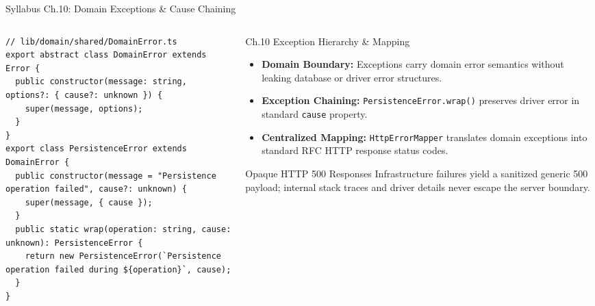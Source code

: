 ﻿\documentclass[aspectratio=169,10pt,t]{beamer}
\begin{document}
\begin{frame}[fragile]{Syllabus Ch.10: Domain Exceptions \& Cause Chaining}
  \vspace{-1.2mm}
  \begin{columns}[T,onlytextwidth]
    \begin{column}{0.54\textwidth}
      \begin{codeBox}
\begin{lstlisting}[basicstyle=\fontsize{5.2pt}{6.2pt}\ttfamily]
// lib/domain/shared/DomainError.ts
export abstract class DomainError extends Error {
  public constructor(message: string, options?: { cause?: unknown }) {
    super(message, options);
  }
}
export class PersistenceError extends DomainError {
  public constructor(message = "Persistence operation failed", cause?: unknown) {
    super(message, { cause });
  }
  public static wrap(operation: string, cause: unknown): PersistenceError {
    return new PersistenceError(`Persistence operation failed during ${operation}`, cause);
  }
}
\end{lstlisting}
      \end{codeBox}
    \end{column}

    \begin{column}{0.44\textwidth}
      \begin{infoCard}{Ch.10 Exception Hierarchy \& Mapping}
        \begin{itemize}\setlength{\itemsep}{1.2pt}\setlength{\parskip}{0pt}\setlength{\leftmargini}{7pt}
          \item \textbf{Domain Boundary:} Exceptions carry domain error semantics without leaking database or driver error structures.
          \item \textbf{Exception Chaining:} \texttt{PersistenceError.wrap()} preserves driver error in standard \texttt{cause} property.
          \item \textbf{Centralized Mapping:} \texttt{HttpErrorMapper} translates domain exceptions into standard RFC HTTP response status codes.
        \end{itemize}
      \end{infoCard}
      \vspace{0.8mm}
      \begin{hlCard}{Opaque HTTP 500 Responses}
        Infrastructure failures yield a sanitized generic 500 payload; internal stack traces and driver details never escape the server boundary.
      \end{hlCard}
    \end{column}
  \end{columns}
\end{frame}
\end{document}
